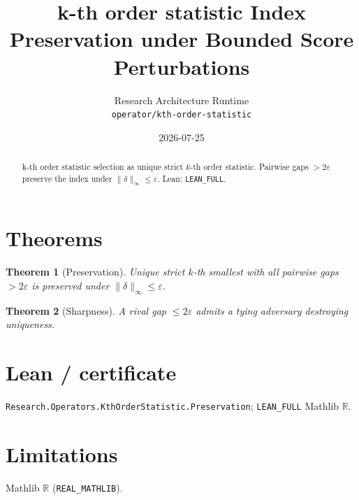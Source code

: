 \documentclass[11pt]{article}
\title{k-th order statistic Index Preservation under Bounded Score Perturbations}
\author{Research Architecture Runtime \\ \texttt{operator/kth-order-statistic}}
\date{2026-07-25}
\newtheorem{theorem}{Theorem}
\begin{document}
\maketitle
\begin{abstract}
k-th order statistic selection as unique strict $k$-th order statistic. Pairwise gaps $>2\varepsilon$
preserve the index under $\|\delta\|_\infty\le\varepsilon$. Lean: \texttt{LEAN\_FULL}.
\end{abstract}
\section{Theorems}
\begin{theorem}[Preservation]
Unique strict $k$-th smallest with all pairwise gaps $>2\varepsilon$ is preserved under
$\|\delta\|_\infty\le\varepsilon$.
\end{theorem}
\begin{theorem}[Sharpness]
A rival gap $\le 2\varepsilon$ admits a tying adversary destroying uniqueness.
\end{theorem}
\section{Lean / certificate}
\texttt{Research.Operators.KthOrderStatistic.Preservation}; \texttt{LEAN\_FULL} Mathlib $\mathbb{R}$.
\section{Limitations}
Mathlib $\mathbb{R}$ (\texttt{REAL\_MATHLIB}).
\end{document}
